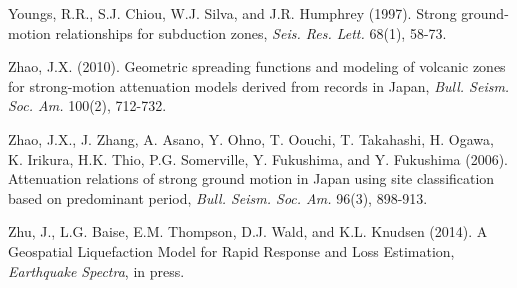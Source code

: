 \documentclass[letterpaper,10pt,english]{sphinxmanual}
\begin{document}
Youngs, R.R., S.J. Chiou, W.J. Silva, and J.R. Humphrey (1997). Strong ground-motion
relationships for subduction zones, \emph{Seis. Res. Lett.} 68(1), 58-73.

Zhao, J.X. (2010). Geometric spreading functions and modeling of volcanic zones for strong-motion
attenuation models derived from records in Japan, \emph{Bull. Seism. Soc. Am.} 100(2), 712-732.

Zhao, J.X., J. Zhang, A. Asano, Y. Ohno, T. Oouchi, T. Takahashi, H. Ogawa, K. Irikura, H.K. Thio, P.G.
Somerville, Y. Fukushima, and Y. Fukushima (2006). Attenuation relations of strong ground motion in
Japan using site classification based on predominant period, \emph{Bull. Seism. Soc. Am.} 96(3), 898-913.

\label{references:zhu2014}
Zhu, J., L.G. Baise, E.M. Thompson, D.J. Wald, and K.L. Knudsen (2014). A Geospatial Liquefaction
Model for Rapid Response and Loss Estimation, \emph{Earthquake Spectra}, in press.
\end{document}
